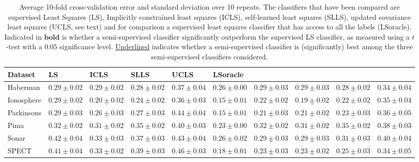 \begin{table}
\caption{Average 10-fold cross-validation error and standard deviation over 10 repeats. The classifiers that have been compared are supervised Least Squares (LS), Implicitly constrained least squares (ICLS), self-learned least squares (SLLS), updated covariance least squares (UCLS, see text) and for comparison a supervised least squares classifier that has access to all the labels (LSoracle). Indicated in $\mathbf{bold}$ is whether a semi-supervised classifier significantly outperform the supervised LS classifier, as measured using a $t$-test with a $0.05$ significance level. \underline{Underlined} indicates whether a semi-supervised classifier is (significantly) best among the three semi-supervised classifiers considered.} \label{table:cvresults}
\begin{tabular}{l|lllllllll}
Dataset & LS & ICLS & SLLS & UCLS & LSoracle \\ 
\hline
Haberman & $0.29 \pm 0.02$& $0.29 \pm 0.02$& $\mathbf{\underline{0.28 \pm 0.02}} $& $0.37 \pm 0.04$& $0.26 \pm 0.00$& $0.29 \pm 0.03$& $0.29 \pm 0.03$& $\mathbf{\underline{0.28 \pm 0.02}} $& $0.34 \pm 0.04$\\ 
Ionosphere & $0.29 \pm 0.02$& $\mathbf{\underline{0.20 \pm 0.02}} $& $\mathbf{0.24 \pm 0.02} $& $0.36 \pm 0.03$& $0.15 \pm 0.01$& $\mathbf{0.22 \pm 0.02} $& $\mathbf{\underline{0.19 \pm 0.02}} $& $\mathbf{0.22 \pm 0.02} $& $0.35 \pm 0.04$\\ 
Parkinsons & $0.29 \pm 0.03$& $\mathbf{\underline{0.26 \pm 0.03}} $& $\mathbf{0.27 \pm 0.03} $& $0.44 \pm 0.04$& $0.15 \pm 0.01$& $\mathbf{\underline{0.21 \pm 0.03}} $& $\mathbf{\underline{0.21 \pm 0.02}} $& $\mathbf{\underline{0.23 \pm 0.03}} $& $0.36 \pm 0.05$\\ 
Pima & $0.32 \pm 0.02$& $\mathbf{\underline{0.31 \pm 0.02}} $& $0.35 \pm 0.02$& $0.40 \pm 0.03$& $0.23 \pm 0.00$& $0.32 \pm 0.02$& $\mathbf{0.31 \pm 0.02} $& $0.35 \pm 0.02$& $0.38 \pm 0.03$\\ 
Sonar & $0.42 \pm 0.04$& $\mathbf{\underline{0.33 \pm 0.03}} $& $\mathbf{0.37 \pm 0.03} $& $0.43 \pm 0.04$& $0.26 \pm 0.02$& $\mathbf{\underline{0.29 \pm 0.03}} $& $\mathbf{\underline{0.29 \pm 0.03}} $& $\mathbf{\underline{0.31 \pm 0.03}} $& $\mathbf{0.40 \pm 0.04} $\\ 
SPECT & $0.41 \pm 0.04$& $\mathbf{\underline{0.33 \pm 0.02}} $& $\mathbf{0.39 \pm 0.03} $& $0.46 \pm 0.03$& $0.18 \pm 0.01$& $\mathbf{\underline{0.23 \pm 0.03}} $& $\mathbf{\underline{0.23 \pm 0.02}} $& $\mathbf{\underline{0.25 \pm 0.03}} $& $\mathbf{0.34 \pm 0.05} $\\ 

\end{tabular}
\end{table}
